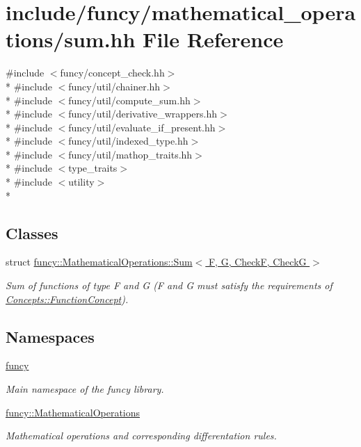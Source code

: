\hypertarget{sum_8hh}{\section{include/funcy/mathematical\-\_\-operations/sum.hh File Reference}
\label{sum_8hh}
}
{\ttfamily \#include $<$funcy/concept\-\_\-check.\-hh$>$}\\*
{\ttfamily \#include $<$funcy/util/chainer.\-hh$>$}\\*
{\ttfamily \#include $<$funcy/util/compute\-\_\-sum.\-hh$>$}\\*
{\ttfamily \#include $<$funcy/util/derivative\-\_\-wrappers.\-hh$>$}\\*
{\ttfamily \#include $<$funcy/util/evaluate\-\_\-if\-\_\-present.\-hh$>$}\\*
{\ttfamily \#include $<$funcy/util/indexed\-\_\-type.\-hh$>$}\\*
{\ttfamily \#include $<$funcy/util/mathop\-\_\-traits.\-hh$>$}\\*
{\ttfamily \#include $<$type\-\_\-traits$>$}\\*
{\ttfamily \#include $<$utility$>$}\\*
\subsection*{Classes}
\begin{DoxyCompactItemize}
\item 
struct \hyperlink{structfuncy_1_1MathematicalOperations_1_1Sum}{funcy\-::\-Mathematical\-Operations\-::\-Sum$<$ F, G, Check\-F, Check\-G $>$}
\begin{DoxyCompactList}\small\item\em Sum of functions of type F and G (F and G must satisfy the requirements of \hyperlink{structfuncy_1_1Concepts_1_1FunctionConcept}{Concepts\-::\-Function\-Concept}). \end{DoxyCompactList}\end{DoxyCompactItemize}
\subsection*{Namespaces}
\begin{DoxyCompactItemize}
\item 
\hyperlink{namespacefuncy}{funcy}
\begin{DoxyCompactList}\small\item\em Main namespace of the funcy library. \end{DoxyCompactList}\item 
\hyperlink{namespacefuncy_1_1MathematicalOperations}{funcy\-::\-Mathematical\-Operations}
\begin{DoxyCompactList}\small\item\em Mathematical operations and corresponding differentation rules. \end{DoxyCompactList}\end{DoxyCompactItemize}
